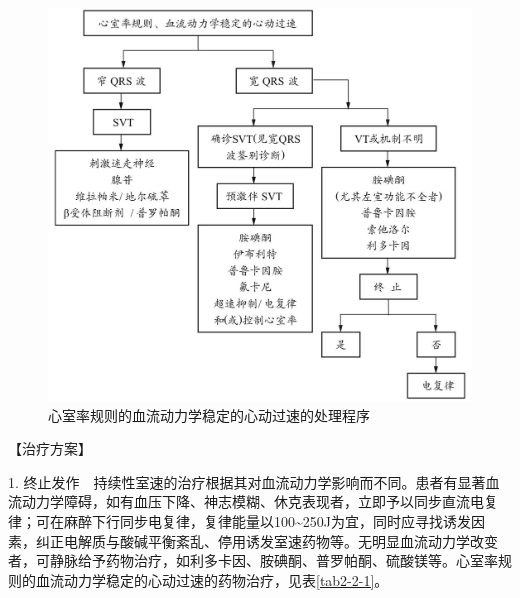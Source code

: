 \begin{figure}[!htbp]
 \centering
 \includegraphics{./images/Image00063.jpg}
 \captionsetup{justification=centering}
 \caption{心室率规则的血流动力学稳定的心动过速的处理程序}
 \label{fig2-2-18}
  \end{figure} 

【治疗方案】

1.
终止发作　持续性室速的治疗根据其对血流动力学影响而不同。患者有显著血流动力学障碍，如有血压下降、神志模糊、休克表现者，立即予以同步直流电复律；可在麻醉下行同步电复律，复律能量以100\textasciitilde{}250J为宜，同时应寻找诱发因素，纠正电解质与酸碱平衡紊乱、停用诱发室速药物等。无明显血流动力学改变者，可静脉给予药物治疗，如利多卡因、胺碘酮、普罗帕酮、硫酸镁等。心室率规则的血流动力学稳定的心动过速的药物治疗，见表\ref{tab2-2-1}。

